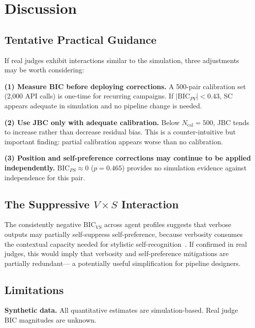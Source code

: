 \documentclass[10pt,conference]{IEEEtran}
\newcommand{\BIC}{\mathrm{BIC}}
\begin{document}
\section{Discussion}
\label{sec:discussion}

\subsection{Tentative Practical Guidance}

If real judges exhibit interactions similar to the simulation,
three adjustments may be worth considering:

\textbf{(1) Measure BIC before deploying corrections.}
A 500-pair calibration set (2,000 API calls) is one-time
for recurring campaigns.
If $|\BIC_{PV}|{<}0.43$, SC appears adequate in simulation
and no pipeline change is needed.

\textbf{(2) Use JBC only with adequate calibration.}
Below $N_\text{cal}{=}500$, JBC tends to increase
rather than decrease residual bias.
This is a counter-intuitive but important finding:
partial calibration appears worse than no calibration.

\textbf{(3) Position and self-preference corrections
may continue to be applied independently.}
$\BIC_{PS}{\approx}0$ ($p{=}0.465$) provides no simulation
evidence against independence for this pair.

\subsection{The Suppressive $V{\times}S$ Interaction}

The consistently negative $\BIC_{VS}$ across agent profiles
suggests that verbose outputs may partially self-suppress
self-preference, because verbosity consumes the contextual
capacity needed for stylistic self-recognition~\cite{panickssery2024llm}.
If confirmed in real judges, this would imply that verbosity
and self-preference mitigations are partially redundant---
a potentially useful simplification for pipeline designers.

\subsection{Limitations}

\textbf{Synthetic data.} All quantitative estimates are
simulation-based. Real judge BIC magnitudes are unknown.
\end{document}
